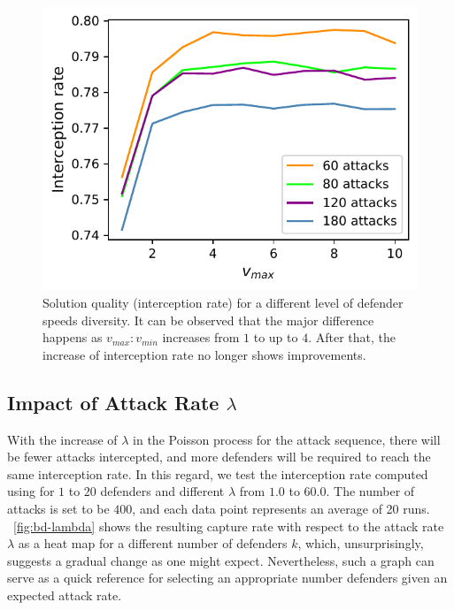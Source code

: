 \begin{figure}[h!]
    \centering
    \includegraphics[width=0.5\linewidth]{chapters/bd/fig/heterogeneity.pdf}
    \caption[Solution quality (interception rate) for a different level of defender speeds diversity]{Solution quality (interception rate) for a different level of defender speeds diversity. It can be observed that the major difference happens as $v_{max}:v_{min}$ increases from $1$ to up to $4$. After that, the increase of interception rate no longer shows improvements.}
    \label{fig:bd-heterogeneity}
    \vspace{-2mm}
\end{figure}

\subsection{Impact of Attack Rate $\lambda$}
With the increase of $\lambda$ in the Poisson process for the attack sequence, 
there will be fewer attacks intercepted, 
and more defenders will be required to reach the same interception rate. 
In this regard, we test the interception rate computed using \ours for $1$ to $20$ defenders and different $\lambda$ from $1.0$ to $60.0$. 
The number of attacks is set to be $400$, and each data point represents an average of 20 runs.
~\ref{fig:bd-lambda} shows the resulting capture rate with respect to the attack rate $\lambda$ as a heat map for a different number of defenders $k$, which, unsurprisingly, suggests a gradual change as one might expect. Nevertheless, such a graph can serve as a quick reference for selecting an appropriate number defenders given an expected attack rate.

